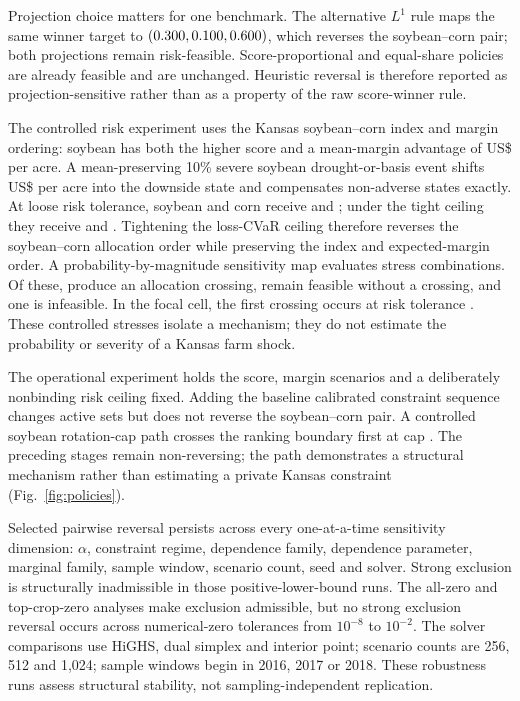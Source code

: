 Projection choice matters for one benchmark. The alternative \(L^1\) rule
maps the same winner target to
\((0.300,0.100,
0.600)\), which reverses the soybean--corn pair; both
projections remain risk-feasible. Score-proportional and equal-share
policies are already feasible and are unchanged. Heuristic reversal is
therefore reported as projection-sensitive rather than as a property of the
raw score-winner rule.

The controlled risk experiment uses the Kansas soybean--corn index and
margin ordering: soybean has both the higher score and a mean-margin advantage
of US\$\RiskMeanGap{} per acre. A mean-preserving 10\% severe soybean
drought-or-basis event shifts US\$\RiskShock{} per acre into the downside
state and compensates non-adverse states exactly. At loose risk tolerance,
soybean and corn receive \RiskLooseSoy{} and \RiskLooseCorn{}; under the tight
ceiling they receive \RiskTightSoy{} and \RiskTightCorn{}.
Tightening the loss-CVaR ceiling therefore reverses the soybean--corn
allocation order while preserving the index and expected-margin order. A
probability-by-magnitude sensitivity map evaluates
\RiskShockCells{} stress combinations. Of these, \RiskShockCrossingCells{}
produce an allocation crossing, \RiskShockNoCrossingCells{} remain feasible
without a crossing, and one is infeasible. In the focal cell, the first
crossing occurs at risk tolerance \RiskFocalFirstCrossing. These controlled
stresses isolate a mechanism; they do not estimate the probability or severity
of a Kansas farm shock.

The operational experiment holds the score, margin scenarios and a
deliberately nonbinding risk ceiling fixed. Adding the baseline calibrated
constraint sequence changes active sets but does not reverse the
soybean--corn pair. A controlled soybean rotation-cap path crosses the ranking
boundary first at cap \OperationalCrossingCap. The preceding stages remain
non-reversing; the path demonstrates a structural mechanism rather than
estimating a private Kansas
constraint (Fig.~\ref{fig:policies}).

Selected pairwise reversal persists across every one-at-a-time sensitivity
dimension:
\(\alpha\), constraint regime, dependence family, dependence parameter,
marginal family, sample window, scenario count, seed and solver. Strong
exclusion is structurally inadmissible in those positive-lower-bound runs.
The all-zero and top-crop-zero analyses make exclusion admissible, but no
strong exclusion reversal occurs across numerical-zero tolerances from
\(10^{-8}\) to \(10^{-2}\).
The solver
comparisons use HiGHS, dual simplex and interior point; scenario counts are
256, 512 and 1,024; sample windows begin in 2016, 2017 or 2018. These
robustness runs assess structural stability, not sampling-independent
replication.

